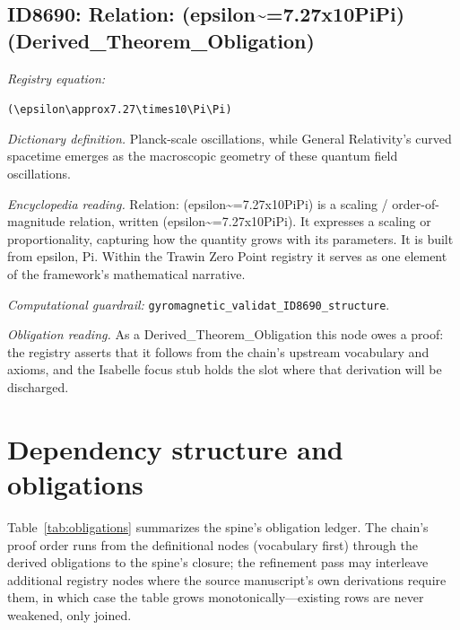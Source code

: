 \documentclass[11pt]{article}
\theoremstyle{remark}
\begin{document}
\subsection{ID8690: Relation: (epsilon\textasciitilde{}=7.27x10PiPi) (Derived\_Theorem\_Obligation)}

\noindent\textit{Registry equation:}\par
{\small\texttt{(\textbackslash{}epsilon\textbackslash{}approx7.27\textbackslash{}times10\textbackslash{}Pi\textbackslash{}Pi)}}\par\medskip
\noindent\textit{Dictionary definition.} Planck-scale oscillations, while General Relativity's curved spacetime emerges as the macroscopic geometry of these quantum field oscillations.\par\medskip
\noindent\textit{Encyclopedia reading.} Relation: (epsilon\textasciitilde{}=7.27x10PiPi) is a scaling / order-of-magnitude relation, written (epsilon\textasciitilde{}=7.27x10PiPi). It expresses a scaling or proportionality, capturing how the quantity grows with its parameters. It is built from epsilon, Pi. Within the Trawin Zero Point registry it serves as one element of the framework's mathematical narrative.
\par\medskip\noindent\textit{Computational guardrail:} \texttt{gyromagnetic\_validat\_ID8690\_structure}.
\par\medskip\noindent\textit{Obligation reading.} As a Derived\_Theorem\_Obligation this node owes a proof: the registry asserts that it follows from the chain's upstream vocabulary and axioms, and the Isabelle focus stub holds the slot where that derivation will be discharged.

\section{Dependency structure and obligations}
\label{sec:dep}

Table~\ref{tab:obligations} summarizes the spine's obligation ledger. The chain's proof order runs from the definitional nodes (vocabulary first) through the derived obligations to the spine's closure; the refinement pass may interleave additional registry nodes where the source manuscript's own derivations require them, in which case the table grows monotonically---existing rows are never weakened, only joined.
\end{document}
